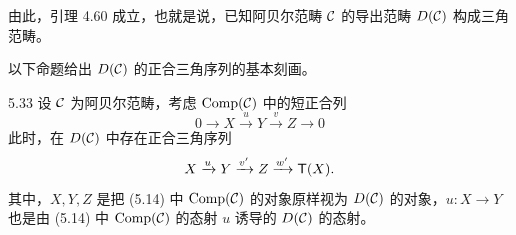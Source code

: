 由此，引理 4.60 成立，也就是说，已知阿贝尔范畴 $\mathcal{C}$ 的导出范畴 $D(\mathcal{C})$ 构成三角范畴。

以下命题给出 $D(\mathcal{C})$ 的正合三角序列的基本刻画。

\begin{proposition}{5.33}
设 $\mathcal{C}$ 为阿贝尔范畴，考虑 $\operatorname{Comp}(\mathcal{C})$ 中的短正合列
\begin{equation}
  0\to X\xrightarrow{u}Y\xrightarrow{v}Z\to 0 \tag{5.14}
\end{equation}
此时，在 $D(\mathcal{C})$ 中存在正合三角序列
\[
  X\xrightarrow{u}Y\xrightarrow{v'}Z\xrightarrow{w'}\mathsf{T}(X).
\]
其中，$X, Y, Z$ 是把 (5.14) 中 $\operatorname{Comp}(\mathcal{C})$ 的对象原样视为 $D(\mathcal{C})$ 的对象，$u\colon X\to Y$ 也是由 (5.14) 中 $\operatorname{Comp}(\mathcal{C})$ 的态射 $u$ 诱导的 $D(\mathcal{C})$ 的态射。
\end{proposition}

